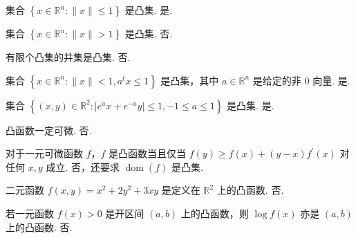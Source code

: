 

\usepackage{tikz}

\newcommand{\Title}{CVX final 2021}
\renewcommand{\due}{due: 11 weeks}
\newcommand{\dom}{\operatorname{dom}} %
\newcommand{\minimize}{\operatorname{minimize}} %
\newcommand{\subject}{\operatorname{subject\ to}}

\newcommand{\todo}{{\color{red} to do}} %
\newcommand{\myline}{{\line(1,0){450}}} %




\begin{problem}[判断]
    集合 $\left\{x \in \mathbb{R}^n: \|x\| \le 1\right\}$ 是凸集.
    \Answer 是.
\end{problem}

\begin{problem}[判断]
    集合 $\left\{x \in \mathbb{R}^n: \|x\| > 1\right\}$ 是凸集.
    \Answer 否.
\end{problem}

\begin{problem}[判断]
    有限个凸集的并集是凸集.
    \Answer 否.
\end{problem}

\begin{problem}[判断]
    集合 $\left\{x \in \mathbb{R}^n: \|x\| < 1, a^tx \le 1\right\}$ 是凸集，其中 $a \in \mathbb{R}^n$ 是给定的非 0 向量.
    \Answer 是.
\end{problem}

\begin{problem}[判断]
    集合 $\left\{(x, y) \in \mathbb{R}^2: |e^ax + e^{-a}y| \le 1, -1 \le a \le 1\right\}$ 是凸集.
    \Answer 是.
\end{problem}

\begin{problem}[判断]
    凸函数一定可微.
    \Answer 否.
\end{problem}

\begin{problem}[判断]
    对于一元可微函数 $f$，$f$ 是凸函数当且仅当 $f(y) \ge f(x) + (y - x)f^\prime(x)$ 对任何 $x, y$ 成立.
    \Answer 否，还要求 $\dom(f)$ 是凸集.
\end{problem}

\begin{problem}[判断]
    二元函数 $f(x, y) = x^2 + 2y^2 + 3xy$ 是定义在 $\mathbb{R}^2$ 上的凸函数.
    \Answer 否.
\end{problem}

\begin{problem}[判断]
    若一元函数 $f(x) > 0$ 是开区间 $(a, b)$ 上的凸函数，则 $\log f(x)$ 亦是 $(a, b)$ 上的凸函数.
    \Answer 否.
\end{problem}

